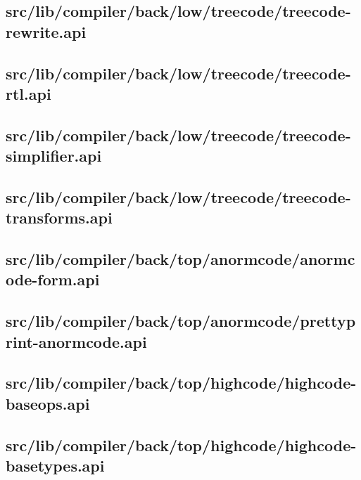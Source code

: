 \subsection{src/lib/compiler/back/low/treecode/treecode-rewrite.api}


\subsection{src/lib/compiler/back/low/treecode/treecode-rtl.api}


\subsection{src/lib/compiler/back/low/treecode/treecode-simplifier.api}


\subsection{src/lib/compiler/back/low/treecode/treecode-transforms.api}


\subsection{src/lib/compiler/back/top/anormcode/anormcode-form.api}


\subsection{src/lib/compiler/back/top/anormcode/prettyprint-anormcode.api}


\subsection{src/lib/compiler/back/top/highcode/highcode-baseops.api}


\subsection{src/lib/compiler/back/top/highcode/highcode-basetypes.api}


